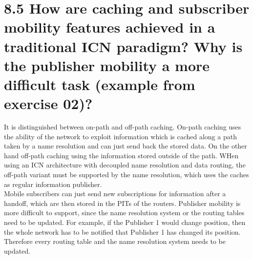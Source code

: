 \documentclass{article}
\begin{document}
	\section*{8.5 How are caching and subscriber mobility features achieved in a traditional ICN paradigm? Why is the publisher mobility a more difficult task (example from exercise 02)?}
	\begin{adjustwidth}{2em}{2em}
		It is distinguished between on-path and off-path caching. On-path caching uses the ability of the network to exploit information which is cached along a path taken by a name resolution and can just send back the stored data. On the other hand off-path caching using the information stored outside of the path. WHen using an ICN architecture with decoupled  name resolution and data routing, the off-path variant must be supported by the name resolution, which uses the caches as regular information publisher. \\
		Mobile subscribers can just send new subscriptions for information after a handoff, which are then stored in the PITs of the routers. Publisher mobility is more difficult to support, since the name resolution system or the routing tables need to be updated. For example, if the Publisher 1 would change position, then the whole network has to be notified that Publisher 1 has changed its position. Therefore every routing table and the name resolution system needs to be updated.
	\end{adjustwidth}
\end{document}

